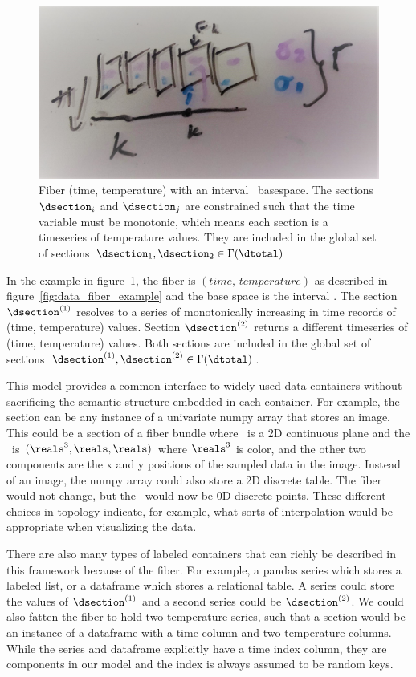 \documentclass[../main.tex]{subfiles}
\begin{document}
\begin{figure}[H]
    \includegraphics[width=.5\linewidth]{figures/math/fiberbundle.png}
    \caption{ Fiber (time, temperature) with an interval \dbase\ basespace. The sections $\dsection_i$ and $\dsection_j$ are constrained such that the time variable must be monotonic, which means each section is a timeseries of temperature values. They are included in the global set of sections  $\dsection_1, \dsection_2 \in \Gamma(\dtotal)$}
    \label{fig:data_sections}
\end{figure}

In the example in figure~\ref{fig:data_sections}, the fiber is $(time, \, temperature)$ as described in figure~\ref{fig:data_fiber_example} and the base space is the interval \dbase. The section $\dsection^{(1)}$ resolves to a series of monotonically increasing in time records of (time, temperature) values. Section $\dsection^{(2)}$ returns a different timeseries of (time, temperature) values. Both sections are included in the global set of sections $\dsection^{(1)}, \dsection^{(2)} \in \Gamma(\dtotal)$.


This model provides a common interface to widely used data containers without sacrificing the semantic structure embedded in each container. For example, the section can be any instance of a univariate numpy array\cite{harris2020array} that stores an image. This could be a section of a fiber bundle where \dbase\ is a 2D continuous plane and the \dfiber\ is $(\reals^{3}, \reals, \reals)$ where $\reals^3$ is color, and the other two components are the x and y positions of the sampled data in the image. Instead of an image, the numpy array could also store a 2D discrete table. The fiber would not change, but the \dbase\ would now be 0D discrete points. These different choices in topology indicate, for example, what sorts of interpolation would be appropriate when visualizing the data. 

There are also many types of labeled containers that can richly be described in this framework because of the fiber. For example, a pandas series which stores a labeled list, or a dataframe\cite{jeff_reback_2020_3715232} which stores a relational table. A series could store the values of $\dsection^{(1)}$ and a second series could be  $\dsection^{(2)}$. We could also fatten the fiber to hold two temperature series, such that a section would be an instance of a dataframe with a time column and two temperature columns. While the series and dataframe explicitly have a time index column, they are components in our model and the index is always assumed to be random keys.
\end{document}
